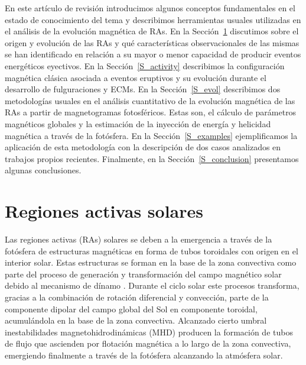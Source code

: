 \documentclass[baaa]{baaa}
\begin{document}
En este artículo de revisión introducimos algunos conceptos fundamentales en el estado de conocimiento del tema y describimos herramientas usuales utilizadas en el análisis de la evolución magnética de RAs. En la Sección~\ref{S_ars} discutimos sobre el origen y evolución de las RAs y qué características observacionales de las mismas se han identificado en relación a su mayor o menor capacidad de producir eventos energéticos eyectivos. En la Sección~\ref{S_activity} describimos la configuración magnética clásica asociada a eventos eruptivos y su evolución durante el desarrollo de fulguraciones y ECMs. En la Sección~\ref{S_evol} describimos dos metodologías usuales en el análisis cuantitativo de la evolución magnética de las RAs a partir de magnetogramas fotosféricos. Estas son, el cálculo de parámetros magnéticos globales y la estimación de la inyección de energía y helicidad magnética a través de la fotósfera. En la Sección~\ref{S_examples} ejemplificamos la aplicación de esta metodología con la descripción de dos casos analizados en trabajos propios recientes. Finalmente, en la Sección~\ref{S_conclusion} presentamos algunas conclusiones.

\section{Regiones activas solares}
\label{S_ars}

Las regiones activas (RAs) solares se deben a la emergencia a través de la fotósfera de estructuras magnéticas en forma de tubos toroidales con origen en el interior solar. Estas estructuras se forman en la base de la zona convectiva como parte del proceso de generación y transformación del campo magnético solar debido al mecanismo de dínamo \citep{charbonneau2020}. Durante el ciclo solar este procesos transforma, gracias a la combinación de rotación diferencial y convección, parte de la componente dipolar del campo global del Sol en componente toroidal, acumulándola en la base de la zona convectiva. Alcanzado cierto umbral \citep{parker1979} inestabilidades magnetohidrodinámicas (MHD) producen la formación de tubos de flujo que ascienden por flotación magnética a lo largo de la zona convectiva, emergiendo finalmente a través de la fotósfera alcanzando la atmósfera solar.
\end{document}
